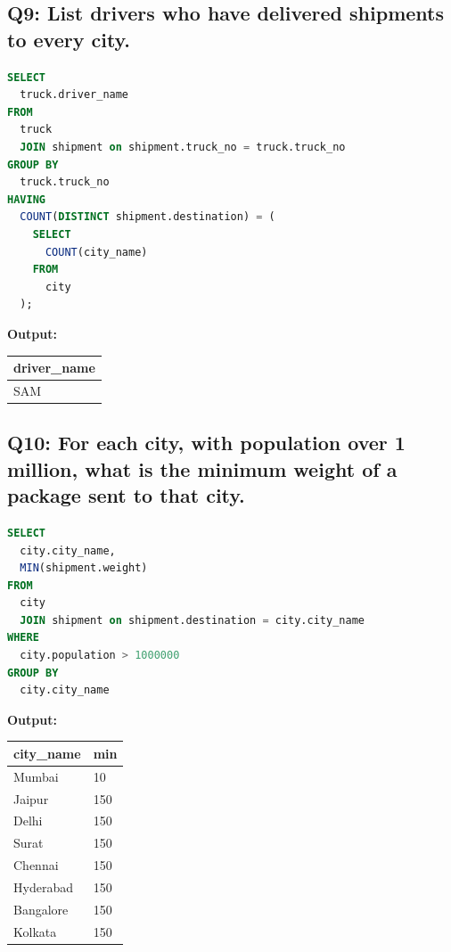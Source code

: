 \documentclass[11pt, a4paper]{article}
\begin{document}
\subsection*{Q9: List drivers who have delivered shipments to every city.}
\begin{lstlisting}[language=SQL]
SELECT
  truck.driver_name
FROM
  truck
  JOIN shipment on shipment.truck_no = truck.truck_no
GROUP BY
  truck.truck_no
HAVING
  COUNT(DISTINCT shipment.destination) = (
    SELECT
      COUNT(city_name)
    FROM
      city
  );
\end{lstlisting}
\vspace{0.3cm}
\textbf{Output:}\vspace{0.2cm}
\begin{center}
\begin{tabular}{|l|}
\hline
\textbf{driver\_name} \\ \hline
SAM \\ \hline
\end{tabular}
\end{center}
\newpage
\subsection*{Q10: For each city, with population over 1 million, what is the minimum weight of a package sent to that city.}
\begin{lstlisting}[language=SQL]
SELECT
  city.city_name,
  MIN(shipment.weight)
FROM
  city
  JOIN shipment on shipment.destination = city.city_name
WHERE
  city.population > 1000000
GROUP BY
  city.city_name
\end{lstlisting}
\vspace{0.3cm}
\textbf{Output:}\vspace{0.2cm}
\begin{center}
\begin{tabular}{|l|l|}
\hline
\textbf{city\_name} & \textbf{min} \\ \hline
Mumbai & 10 \\ \hline
Jaipur & 150 \\ \hline
Delhi & 150 \\ \hline
Surat & 150 \\ \hline
Chennai & 150 \\ \hline
Hyderabad & 150 \\ \hline
Bangalore & 150 \\ \hline
Kolkata & 150 \\ \hline
\end{tabular}
\end{center}
\newpage
\end{document}
